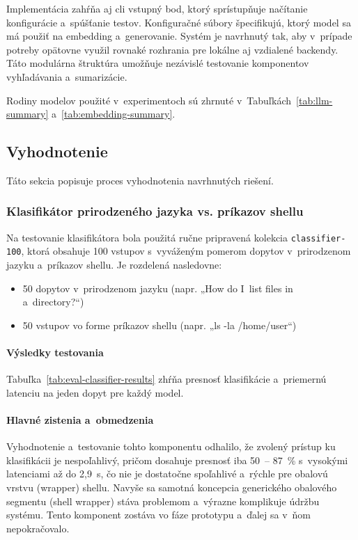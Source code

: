 Implementácia zahŕňa aj \gls{cli} vstupný bod, ktorý sprístupňuje načítanie konfigurácie a~spúšťanie testov. Konfiguračné súbory špecifikujú, ktorý model sa má použiť na embedding a~generovanie. Systém je navrhnutý tak, aby v~prípade potreby opätovne využil rovnaké rozhrania pre lokálne aj vzdialené backendy. Táto modulárna štruktúra umožňuje nezávislé testovanie komponentov vyhľadávania a~sumarizácie.

Rodiny modelov použité v~experimentoch sú zhrnuté v~Tabuľkách~\ref{tab:llm-summary} a~\ref{tab:embedding-summary}.


\subsection*{Vyhodnotenie}

Táto sekcia popisuje proces vyhodnotenia navrhnutých riešení.

\subsubsection*{Klasifikátor prirodzeného jazyka vs. príkazov shellu}

Na testovanie klasifikátora bola použitá ručne pripravená kolekcia \texttt{classifier-100}, ktorá obsahuje 100 vstupov s~vyváženým pomerom dopytov v~prirodzenom jazyku a~príkazov shellu. Je rozdelená nasledovne:
\begin{itemize}
  \item 50 dopytov v~prirodzenom jazyku (napr. „How do I~list files in a~directory?“)
  \item 50 vstupov vo forme príkazov shellu (napr. „ls -la /home/user“)
\end{itemize}

\paragraph{Výsledky testovania}{}
Tabuľka~\ref{tab:eval-classifier-results} zhŕňa presnosť klasifikácie a~priemernú latenciu na jeden dopyt pre každý model.

\paragraph{Hlavné zistenia a~obmedzenia}
Vyhodnotenie a~testovanie tohto komponentu odhalilo, že zvolený prístup ku klasifikácii je nespoľahlivý, pričom dosahuje presnosť iba 50~-- 87~\% s~vysokými latenciami až do 2,9~s, čo nie je dostatočne spoľahlivé a~rýchle pre obalovú vrstvu (wrapper) shellu. Navyše sa samotná koncepcia generického obalového segmentu (shell wrapper) stáva problemom a~výrazne komplikuje údržbu systému. Tento komponent zostáva vo fáze prototypu a~ďalej sa v~ňom nepokračovalo.


